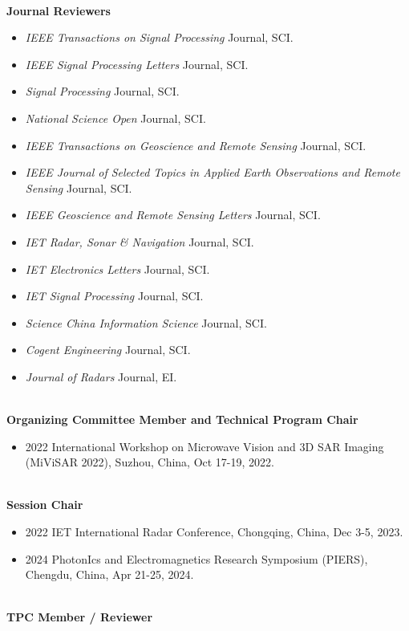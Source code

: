 \documentclass[paper=a4,fontsize=11pt]{scrartcl}
\begin{document}
~\\

\textbf{Journal Reviewers} 
\begin{itemize}
	\item \textit{IEEE Transactions on Signal Processing} Journal, SCI.
	\item \textit{IEEE Signal Processing Letters} Journal, SCI.
	\item \textit{Signal Processing} Journal, SCI.
	\item \textit{National Science Open} Journal, SCI.
	\item \textit{IEEE Transactions on Geoscience and Remote Sensing} Journal, SCI.
	\item \textit{IEEE Journal of Selected Topics in Applied Earth Observations and Remote Sensing} Journal, SCI.
	\item \textit{IEEE Geoscience and Remote Sensing Letters} Journal, SCI.
	\item \textit{IET Radar, Sonar \& Navigation} Journal, SCI.
	\item \textit{IET Electronics Letters} Journal, SCI.
	\item \textit{IET Signal Processing} Journal, SCI.
	\item \textit{Science China Information Science} Journal, SCI.
	\item \textit{Cogent Engineering} Journal, SCI.
	\item \textit{Journal of Radars} Journal, EI.
\end{itemize}
~\\
\textbf{Organizing Committee Member and Technical Program Chair} 
\begin{itemize}
	\item 2022 International Workshop on Microwave Vision and 3D SAR Imaging (MiViSAR 2022), Suzhou, China, Oct 17-19, 2022.
\end{itemize}
~\\
\textbf{Session Chair} 
\begin{itemize}
	\item 2022 IET International Radar Conference, Chongqing, China, Dec 3-5, 2023.
	\item 2024 PhotonIcs and Electromagnetics Research Symposium (PIERS), Chengdu, China, Apr 21-25, 2024.
\end{itemize}
~\\
\textbf{TPC Member / Reviewer}
\end{document}
